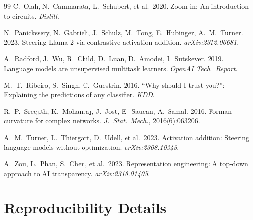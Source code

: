 \documentclass[10pt,twocolumn]{article}
\begin{document}
\begin{thebibliography}{99}
C.~Olah, N.~Cammarata, L.~Schubert, et al.\ 2020. Zoom in: An introduction to circuits. \emph{Distill}.

N.~Panickssery, N.~Gabrieli, J.~Schulz, M.~Tong, E.~Hubinger, A.~M.~Turner. 2023. Steering Llama 2 via contrastive activation addition. \emph{arXiv:2312.06681}.

A.~Radford, J.~Wu, R.~Child, D.~Luan, D.~Amodei, I.~Sutskever. 2019. Language models are unsupervised multitask learners. \emph{OpenAI Tech.\ Report}.

M.~T.~Ribeiro, S.~Singh, C.~Guestrin. 2016. ``Why should I trust you?'': Explaining the predictions of any classifier. \emph{KDD}.

R.~P.~Sreejith, K.~Mohanraj, J.~Jost, E.~Saucan, A.~Samal. 2016. Forman curvature for complex networks. \emph{J.\ Stat.\ Mech.}, 2016(6):063206.

A.~M.~Turner, L.~Thiergart, D.~Udell, et al.\ 2023. Activation addition: Steering language models without optimization. \emph{arXiv:2308.10248}.

A.~Zou, L.~Phan, S.~Chen, et al.\ 2023. Representation engineering: A top-down approach to AI transparency. \emph{arXiv:2310.01405}.

\end{thebibliography}

\appendix
\onecolumn

\section{Reproducibility Details}
\label{app:repro}
\end{document}
